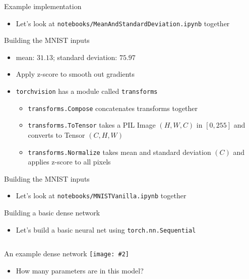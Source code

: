 \documentclass[hyperref={pdfpagelabels=false},12pt]{beamer}
\newcommand{\ig}[2]{\texttt{[image: \#2]}}
\newcommand{\code}[2]{\texttt{#2}}
\newcommand{\python}[1]{\code{python}{#1}}
\newcommand{\pygment}[3]{\inputminted[bgcolor=lightgray,linenos,fontsize=#1]{#2}{#3}}
\begin{document}
\begin{frame}{Example implementation}
  \begin{itemize}
    \item Let's look at \texttt{notebooks/MeanAndStandardDeviation.ipynb} together
  \end{itemize}
\end{frame}

\begin{frame}{Building the MNIST inputs}
  \begin{itemize}
    \item mean: $31.13$; standard deviation: $75.97$
    \item Apply z-score to smooth out gradients
    \item \texttt{torchvision} has a module called \texttt{transforms}
    \begin{itemize}
      \item \python{transforms.Compose} concatenates transforms together
      \item \python{transforms.ToTensor} takes a PIL Image $(H, W, C)$
        in $[0, 255]$ and converts to Tensor $(C, H, W)$
      \item \python{transforms.Normalize} takes mean and standard deviation
        $(C)$ and applies z-score to all pixels
    \end{itemize}
  \end{itemize}
\end{frame}

\begin{frame}{Building the MNIST inputs}
  \begin{itemize}
    \item Let's look at \texttt{notebooks/MNISTVanilla.ipynb} together
  \end{itemize}
\end{frame}

\begin{frame}{Building a basic dense network}
  \begin{itemize}
    \item Let's build a basic neural net using \python{torch.nn.Sequential}
  \end{itemize}
  \pygment{\scriptsize}{python}{code/basic-dense-model.py}
\end{frame}

\begin{frame}{An example dense network}
  \ig{1.0}{figures/dense-neural-net.png}
  \begin{itemize}
    \item How many parameters are in this model?
  \end{itemize}
\end{frame}
\end{document}
